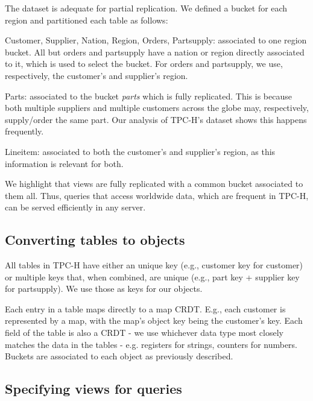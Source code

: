 \documentclass[sigplan,10pt]{acmart}
\begin{document}
The dataset is adequate for partial replication.
We defined a bucket for each region and partitioned each table as follows:

\begin{compactitem}
	\item Customer, Supplier, Nation, Region, Orders, Partsupply: associated to one region bucket. 
	All but orders and partsupply have a nation or region directly associated to it, which is used to select the bucket.
	For orders and partsupply, we use, respectively, the customer's and supplier's region.
	\item Parts: associated to the bucket \emph{parts} which is fully replicated.
	This is because both multiple suppliers and multiple customers across the globe may, respectively, supply/order the same part.
	Our analysis of TPC-H's dataset shows this happens frequently.
	\item Lineitem: associated to both the customer's and supplier's region, as this information is relevant for both.
\end{compactitem}

We highlight that views are fully replicated with a common bucket associated to them all.
Thus, queries that access worldwide data, which are frequent in TPC-H, can  be served efficiently in any server.

\subsection{Converting tables to objects}
\label{subsec:tables_to_objects}

All tables in TPC-H have either an unique key (e.g., customer key for customer) or multiple keys that, when combined, are unique (e.g., part key + supplier key for partsupply).
We use those as keys for our objects.	%

Each entry in a table maps directly to a map CRDT.
E.g., each customer is represented by a map, with the map's object key being the customer's key.
Each field of the table is also a CRDT - we use whichever data type most closely matches the data in the tables - e.g. registers for strings, counters for numbers.
Buckets are associated to each object as previously described.

\subsection{Specifying views for queries}
\label{subsec:views_for_queries}
\end{document}
